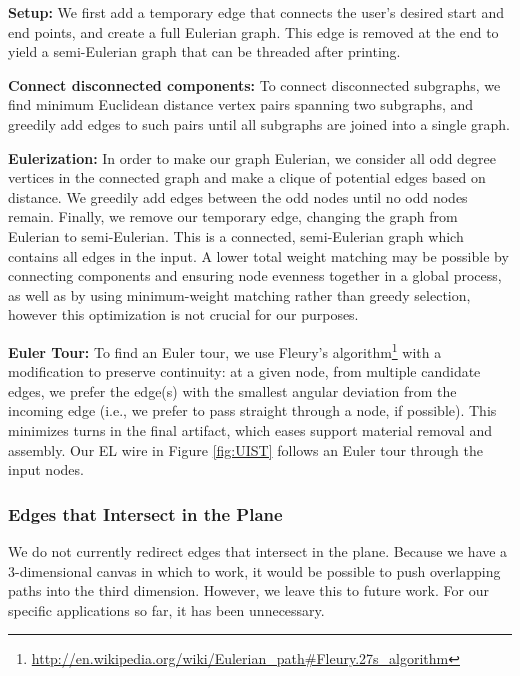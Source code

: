 {\bf Setup:} We first add a temporary edge that connects the user's desired start and end points, and create a full Eulerian graph.  This edge is removed at the end to yield a semi-Eulerian graph that can be threaded after printing.

{\bf Connect disconnected components:} To connect disconnected subgraphs, we find minimum Euclidean distance vertex pairs spanning two subgraphs, and greedily add edges to such pairs until all subgraphs are joined into a single graph.

{\bf Eulerization:} In order to make our graph Eulerian, we consider all odd degree vertices in the connected graph and make a clique of potential edges based on distance.  We greedily add edges between the odd nodes until no odd nodes remain.  Finally, we remove our temporary edge, changing the graph from Eulerian to semi-Eulerian.  This is a connected, semi-Eulerian graph which contains all edges in the input.
A lower total weight matching may be possible by connecting components and ensuring node evenness together in a global process, as well as by using minimum-weight matching rather than greedy selection, however this optimization is not crucial for our purposes.

{\bf Euler Tour:} To find an Euler tour, we use Fleury's algorithm\footnote{\url{http://en.wikipedia.org/wiki/Eulerian_path\#Fleury.27s_algorithm}} with a modification to preserve continuity: at a given node, from multiple candidate edges, we prefer the edge(s) with the smallest angular deviation from the incoming edge (i.e., we prefer to pass straight through a node, if possible).  This minimizes turns in the final artifact, which eases support material removal and assembly.  Our EL wire in Figure \ref{fig:UIST} follows an Euler tour through the input nodes.

\subsubsection{Edges that Intersect in the Plane}
We do not currently redirect edges that intersect in the plane.  Because we have a 3-dimensional canvas in which to work, it would be possible to push overlapping paths into the third dimension.  However, we leave this to future work.  For our specific applications so far, it has been unnecessary.

